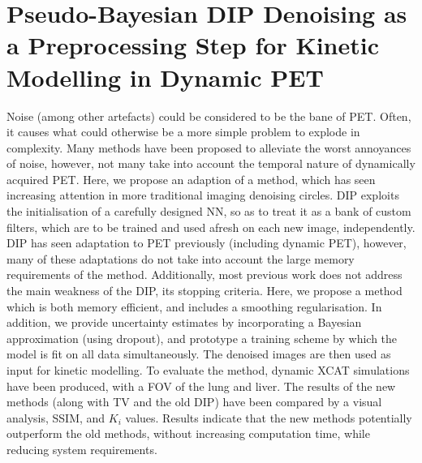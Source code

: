 \chapter{Pseudo-Bayesian DIP Denoising as a Preprocessing Step for Kinetic Modelling in Dynamic PET} \label{sec:pseudo_bayesian_dip_denoising_as_a_preprocessing_step_for_kinetic_modelling_in_dynamic_pet_appendix}
    \newpage

        Noise (among other artefacts) could be considered to be the bane of \gls{PET}. Often, it causes what could otherwise be a more simple problem to explode in complexity. Many methods have been proposed to alleviate the worst annoyances of noise, however, not many take into account the temporal nature of dynamically acquired \gls{PET}. Here, we propose an adaption of a method, which has seen increasing attention in more traditional imaging denoising circles. \gls{DIP} exploits the initialisation of a carefully designed \gls{NN}, so as to treat it as a bank of custom filters, which are to be trained and used afresh on each new image, independently. \gls{DIP} has seen adaptation to \gls{PET} previously (including dynamic \gls{PET}), however, many of these adaptations do not take into account the large memory requirements of the method. Additionally, most previous work does not address the main weakness of the \gls{DIP}, its stopping criteria. Here, we propose a method which is both memory efficient, and includes a smoothing regularisation. In addition, we provide uncertainty estimates by incorporating a Bayesian approximation (using dropout), and prototype a training scheme by which the model is fit on all data simultaneously. The denoised images are then used as input for kinetic modelling. To evaluate the method, dynamic \gls{XCAT} simulations have been produced, with a \gls{FOV} of the lung and liver. The results of the new methods (along with \gls{TV} and the old \gls{DIP}) have been compared by a visual analysis, \gls{SSIM}, and $K_i$ values. Results indicate that the new methods potentially outperform the old methods, without increasing computation time, while reducing system requirements.

